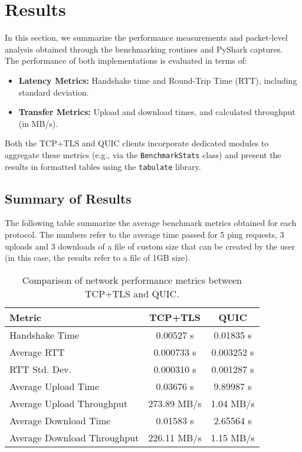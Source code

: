 \section{Results}
In this section, we summarize the performance measurements and packet-level analysis obtained through the benchmarking routines and PyShark captures. \\
The performance of both implementations is evaluated in terms of:

\begin{itemize}
    \item \textbf{Latency Metrics:} Handshake time and Round-Trip Time (RTT), including standard deviation.
    
    \item \textbf{Transfer Metrics:} Upload and download times, and calculated throughput (in MB/s).
\end{itemize}

Both the TCP+TLS and QUIC clients incorporate dedicated modules to aggregate these metrics (e.g., via the \texttt{BenchmarkStats} class) and present the results in formatted tables using the \texttt{tabulate} library.

\subsection{Summary of Results}
The following table summarize the average benchmark metrics obtained for each protocol. The numbers refer to the average time passed for 5 ping requests, 3 uploads and 3 downloads of a file of custom size that can be created by the user (in this case, the results refer to a file of 1GB size).

\begin{table}[h!]
\centering
\begin{tabular}{lcc}
\toprule
\textbf{Metric} & \textbf{TCP+TLS} & \textbf{QUIC} \\
\midrule
Handshake Time & 0.00527 s & 0.01835 s \\
Average RTT & 0.000733 s & 0.003252 s \\
RTT Std. Dev. & 0.000310 s & 0.001287 s \\
Average Upload Time & 0.03676 s & 9.89987 s \\
Average Upload Throughput & 273.89 MB/s & 1.04 MB/s \\
Average Download Time & 0.01583 s & 2.65564 s \\
Average Download Throughput & 226.11 MB/s & 1.15 MB/s \\
\bottomrule
\end{tabular}
\caption{Comparison of network performance metrics between TCP+TLS and QUIC.}
\end{table}

